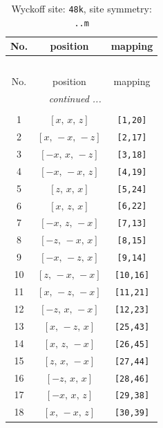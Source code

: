 \documentclass[fleqn,8pt]{jsarticle}
\begin{document}
\renewcommand{\arraystretch}{1.2}
\begin{longtable}{ccc}
\caption{Wyckoff site: {\tt 48k}, site symmetry: {\tt ..m}}
 \\
 \hline \hline
No. & position & mapping \\ \hline \endfirsthead

\multicolumn{2}{l}{\tablename\ \thetable{}} \\
 \hline \hline
No. & position & mapping \\ \hline \endhead

 \hline \hline
\multicolumn{2}{r}{\footnotesize\it continued ...} \\ \endfoot

 \hline \hline
\multicolumn{2}{r}{} \\ \endlastfoot

1 & $\left[ x,\, x,\, z \right]$ & {\tt [1,20]} \\ \hline
2 & $\left[ x,\, - x,\, - z \right]$ & {\tt [2,17]} \\ \hline
3 & $\left[ - x,\, x,\, - z \right]$ & {\tt [3,18]} \\ \hline
4 & $\left[ - x,\, - x,\, z \right]$ & {\tt [4,19]} \\ \hline
5 & $\left[ z,\, x,\, x \right]$ & {\tt [5,24]} \\ \hline
6 & $\left[ x,\, z,\, x \right]$ & {\tt [6,22]} \\ \hline
7 & $\left[ - x,\, z,\, - x \right]$ & {\tt [7,13]} \\ \hline
8 & $\left[ - z,\, - x,\, x \right]$ & {\tt [8,15]} \\ \hline
9 & $\left[ - x,\, - z,\, x \right]$ & {\tt [9,14]} \\ \hline
10 & $\left[ z,\, - x,\, - x \right]$ & {\tt [10,16]} \\ \hline
11 & $\left[ x,\, - z,\, - x \right]$ & {\tt [11,21]} \\ \hline
12 & $\left[ - z,\, x,\, - x \right]$ & {\tt [12,23]} \\ \hline
13 & $\left[ x,\, - z,\, x \right]$ & {\tt [25,43]} \\ \hline
14 & $\left[ x,\, z,\, - x \right]$ & {\tt [26,45]} \\ \hline
15 & $\left[ z,\, x,\, - x \right]$ & {\tt [27,44]} \\ \hline
16 & $\left[ - z,\, x,\, x \right]$ & {\tt [28,46]} \\ \hline
17 & $\left[ - x,\, x,\, z \right]$ & {\tt [29,38]} \\ \hline
18 & $\left[ x,\, - x,\, z \right]$ & {\tt [30,39]} \\ \hline

\end{longtable}
\end{document}

